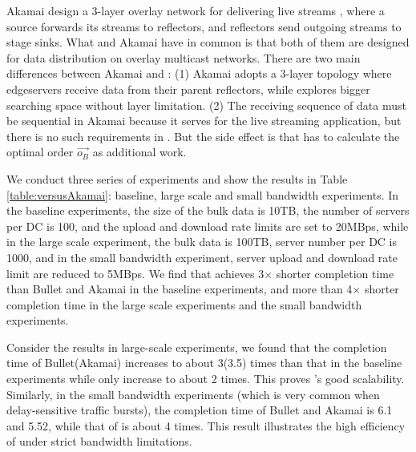 Akamai design a 3-layer overlay network for delivering live streams \cite{Andreev2013Designing}, where a source forwards its streams to reflectors, and reflectors send outgoing streams to stage sinks. What \name and Akamai have in common is that both of them are designed for data distribution on overlay multicast networks. There are two main differences between Akamai and \name: (1) Akamai adopts a 3-layer topology where edgeservers receive data from their parent reflectors, while \name explores bigger searching space without layer limitation. (2) The receiving sequence of data must be sequential in Akamai because it serves for the live streaming application, but there is no such requirements in \name. But the side effect is that \name has to calculate the optimal order $\overrightarrow{o_B}$ as additional work.

We conduct three series of experiments and show the results in Table \ref{table:versusAkamai}: baseline, large scale and small bandwidth experiments. In the baseline experiments, the size of the bulk data is 10TB, the number of servers per DC is 100, and the upload and download rate limits are set to 20MBps, while in the large scale experiment, the bulk data is 100TB, server number per DC is 1000, and in the small bandwidth experiment, server upload and download rate limit are reduced to 5MBps. We find that \name achieves 3$\times$ shorter completion time than Bullet and Akamai in the baseline experiments, and more than 4$\times$ shorter completion time in the large scale experiments and the small bandwidth experiments.

Consider the results in large-scale experiments, we found that the completion time of Bullet(Akamai) increases to about 3(3.5) times than that in the baseline experiments while \name only increase to about 2 times. This proves \name's good scalability. Similarly, in the small bandwidth experiments (which is very common when delay-sensitive traffic bursts), the completion time of Bullet and Akamai is 6.1 and 5.52, while that of \name is about 4 times. This result illustrates the high efficiency of \name under strict bandwidth limitations.

